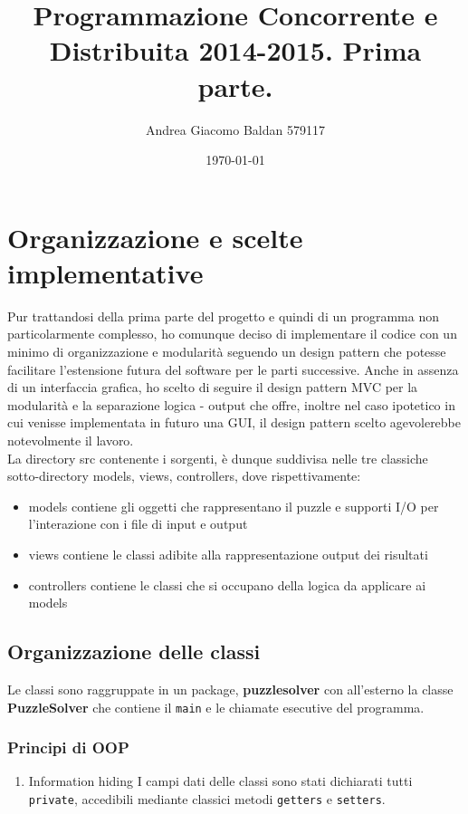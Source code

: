 \documentclass[11pt,a4paper]{article}
\author{Andrea Giacomo Baldan 579117}
\date{\today}
\title{Programmazione Concorrente e Distribuita 2014-2015. Prima parte.}
\begin{document}
\maketitle
\tableofcontents

\section{Organizzazione e scelte implementative}
\label{sec-1}
Pur trattandosi della prima parte del progetto e quindi di un programma non particolarmente complesso, ho comunque deciso di implementare il codice con un minimo di organizzazione
e modularità seguendo un design pattern che potesse facilitare l'estensione futura del software per le parti successive.
Anche in assenza di un interfaccia grafica, ho scelto di seguire il design pattern MVC per la modularità e la separazione logica - output che offre, inoltre nel caso ipotetico 
in cui venisse implementata in futuro una GUI, il design pattern scelto agevolerebbe notevolmente il lavoro.\\
La directory src contenente i sorgenti, è dunque suddivisa nelle tre classiche sotto-directory models, views, controllers, dove rispettivamente:
\begin{itemize}
\item models contiene gli oggetti che rappresentano il puzzle e supporti I/O per l'interazione con i file di input e output
\item views contiene le classi adibite alla rappresentazione output dei risultati
\item controllers contiene le classi che si occupano della logica da applicare ai models
\end{itemize}
\subsection{Organizzazione delle classi}
\label{sec-1-1}
Le classi sono raggruppate in un package, \textbf{puzzlesolver} con all'esterno la classe \textbf{PuzzleSolver} che contiene il \verb~main~ e le chiamate esecutive del programma.
\subsubsection{Principi di OOP}
\label{sec-1-1-1}
\begin{enumerate}
\item Information hiding
\label{sec-1-1-1-1}
I campi dati delle classi sono stati dichiarati tutti \verb~private~, accedibili mediante classici metodi \verb~getters~ e \verb~setters~.
\end{enumerate}
\end{document}
